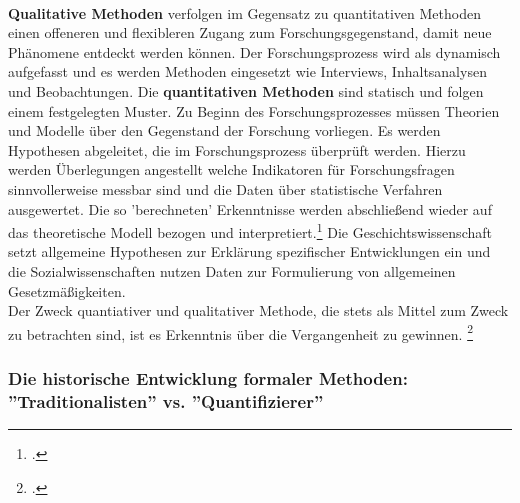 \documentclass[12pt,a4paper]{article}
\begin{document}
\\
\textbf{Qualitative Methoden} verfolgen im Gegensatz zu quantitativen Methoden einen offeneren und flexibleren Zugang zum Forschungsgegenstand, damit neue Phänomene entdeckt werden können. Der Forschungsprozess wird als dynamisch aufgefasst und es werden Methoden eingesetzt wie Interviews, Inhaltsanalysen und Beobachtungen. Die \textbf{quantitativen Methoden} sind statisch und folgen einem festgelegten Muster. Zu Beginn des Forschungsprozesses müssen Theorien und Modelle über den Gegenstand der Forschung vorliegen. Es werden Hypothesen abgeleitet, die im Forschungsprozess überprüft werden. Hierzu werden Überlegungen angestellt welche Indikatoren für Forschungsfragen sinnvollerweise messbar sind und die Daten über statistische Verfahren ausgewertet. Die so 'berechneten' Erkenntnisse werden abschließend wieder auf das theoretische Modell bezogen und interpretiert.\footcite[][S.309–329]{wolf1995qualitative} Die Geschichtswissenschaft setzt allgemeine Hypothesen zur Erklärung spezifischer Entwicklungen ein und die Sozialwissenschaften nutzen Daten zur Formulierung von allgemeinen Gesetzmäßigkeiten.
\\
Der Zweck quantiativer und qualitativer Methode, die stets als Mittel zum Zweck zu betrachten sind, ist es Erkenntnis über die Vergangenheit zu gewinnen. \footcite[][S.203-206]{jarausch1985quantitative}

\subsubsection{Die historische Entwicklung formaler Methoden: ''Traditionalisten'' vs. ''Quantifizierer'' }
\end{document}
